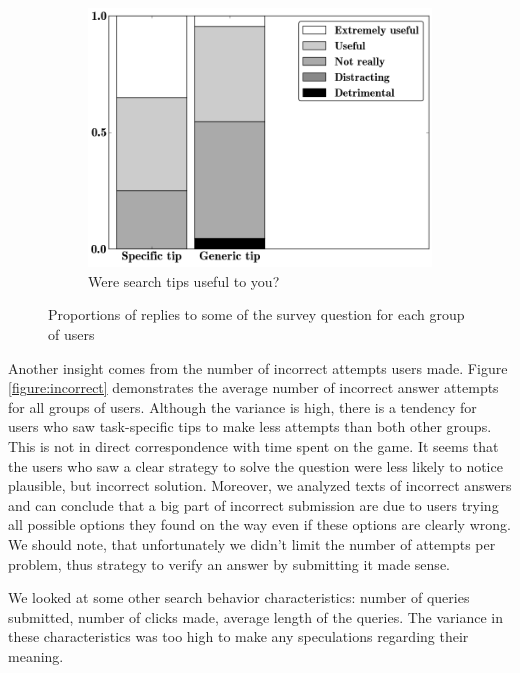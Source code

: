 \documentclass{sig-alternate}
\begin{document}
\begin{figure}[ht]
\begin{subfigure}[t]{0.3\textwidth}
	\includegraphics[scale=0.26]{img/useful}
	\caption{Were search tips useful to you?}
    \label{figure:survey:useful}
\end{subfigure}
\caption{Proportions of replies to some of the survey question for each group of users}
\label{figure:survey}
\end{figure}

Another insight comes from the number of incorrect attempts users made.
Figure \ref{figure:incorrect} demonstrates the average number of incorrect answer attempts for all groups of users.
Although the variance is high, there is a tendency for users who saw task-specific tips to make less attempts than both other groups.
This is not in direct correspondence with time spent on the game.
It seems that the users who saw a clear strategy to solve the question were less likely to notice plausible, but incorrect solution.
Moreover, we analyzed texts of incorrect answers and can conclude that a big part of incorrect submission are due to users trying all possible options they found on the way even if these options are clearly wrong.
We should note, that unfortunately we didn't limit the number of attempts per problem, thus strategy to verify an answer by submitting it made sense.

We looked at some other search behavior characteristics: number of queries submitted, number of clicks made, average length of the queries. The variance in these characteristics was too high to make any speculations regarding their meaning.
\end{document}
